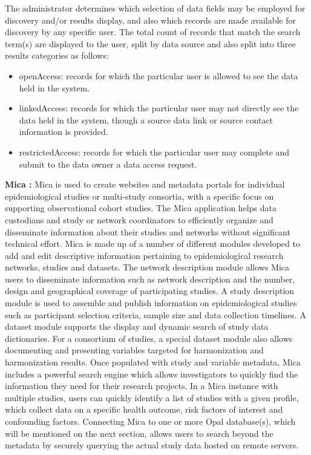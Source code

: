 The administrator determines which selection of data fields may be employed for
discovery and/or results display, and also which records are made available for
discovery by any specific user.
The total count of records that match the search term(s) are displayed to the user,
split by data source and also split into three results categories as follows:
\begin{itemize}
    \item openAccess: records for which the particular user is allowed to see the data
        held in the system.
    \item linkedAccess: records for which the particular user may not directly see the
        data held in the system, though a source data link or source contact
        information is provided.
    \item restrictedAccess: records for which the particular user may complete and
        submit to the data owner a data access request.
\end{itemize}

\textbf{Mica \cite{mica}:}
Mica is used to create websites and metadata portals for individual epidemiological
studies or multi-study consortia, with a specific focus on supporting observational
cohort studies.
The Mica application helps data custodians and study or network coordinators to
efficiently organize and disseminate information about their studies and networks
without significant technical effort.
Mica is made up of a number of different modules developed to add and edit descriptive
information pertaining to epidemiological research networks, studies and datasets.
The network description module allows Mica users to disseminate information such as
network description and the number, design and geographical coverage of participating
studies.
A study description module is used to assemble and publish information on
epidemiological studies such as participant selection criteria, sample size and data
collection timelines.
A dataset module supports the display and dynamic search of study data dictionaries.
For a consortium of studies, a special dataset module also allows documenting and
presenting variables targeted for harmonization and harmonization results.
Once populated with study and variable metadata, Mica includes a powerful search engine
which allows investigators to quickly find the information they need for their research
projects.
In a Mica instance with multiple studies, users can quickly identify a list of studies
with a given profile, which collect data on a specific health outcome, risk factors of
interest and confounding factors.
Connecting Mica to one or more Opal database(s), which will be mentioned on the next
section, allows users to search beyond the metadata by securely querying the actual
study data hosted on remote servers.

